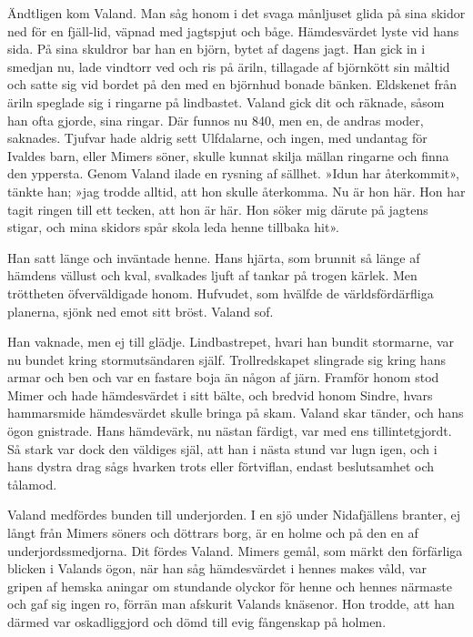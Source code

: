 Ändtligen kom Valand. Man såg honom i det svaga månljuset glida på sina
skidor ned för en fjäll-lid, väpnad med jagtspjut och båge. Hämdesvärdet
lyste vid hans sida. På sina skuldror bar han en björn, bytet af dagens
jagt. Han gick in i smedjan nu, lade vindtorr ved och ris på äriln,
tillagade af björnkött sin måltid och satte sig vid bordet på den med en
björnhud bonade bänken. Eldskenet från äriln speglade sig i ringarne på
lindbastet. Valand gick dit och räknade, såsom han ofta gjorde, sina
ringar. Där funnos nu 840, men en, de andras moder, saknades. Tjufvar
hade aldrig sett Ulfdalarne, och ingen, med undantag för Ivaldes barn,
eller Mimers söner, skulle kunnat skilja mällan ringarne och finna den
yppersta. Genom Valand ilade en rysning af sällhet. »Idun har
återkommit», tänkte han; »jag trodde alltid, att hon skulle återkomma.
Nu är hon här. Hon har tagit ringen till ett tecken, att hon är här. Hon
söker mig därute på jagtens stigar, och mina skidors spår skola leda
henne tillbaka hit».

Han satt länge och inväntade henne. Hans hjärta, som brunnit så länge af
hämdens vällust och kval, svalkades ljuft af tankar på trogen kärlek.
Men tröttheten öfverväldigade honom. Hufvudet, som hvälfde de
världsfördärfliga planerna, sjönk ned emot sitt bröst. Valand sof.

Han vaknade, men ej till glädje. Lindbastrepet, hvari
han bundit stormarne, var nu bundet kring stormutsändaren själf.
Trollredskapet slingrade sig kring hans armar och ben och var en fastare
boja än någon af järn. Framför honom stod Mimer och hade hämdesvärdet i
sitt bälte, och bredvid honom Sindre, hvars hammarsmide hämdesvärdet
skulle bringa på skam. Valand skar tänder, och hans ögon gnistrade. Hans
hämdevärk, nu nästan färdigt, var med ens tillintetgjordt. Så stark var
dock den väldiges själ, att han i nästa stund var lugn igen, och i hans
dystra drag sågs hvarken trots eller förtviflan, endast beslutsamhet och
tålamod.

Valand medfördes bunden till underjorden. I en sjö under Nidafjällens
branter, ej långt från Mimers söners och döttrars borg, är en holme och
på den en af underjordssmedjorna. Dit fördes Valand. Mimers gemål, som
märkt den förfärliga blicken i Valands ögon, när han såg hämdesvärdet i
hennes makes våld, var gripen af hemska aningar om stundande olyckor för
henne och hennes närmaste och gaf sig ingen ro, förrän man afskurit
Valands knäsenor. Hon trodde, att han därmed var oskadliggjord och dömd
till evig fångenskap på holmen.

